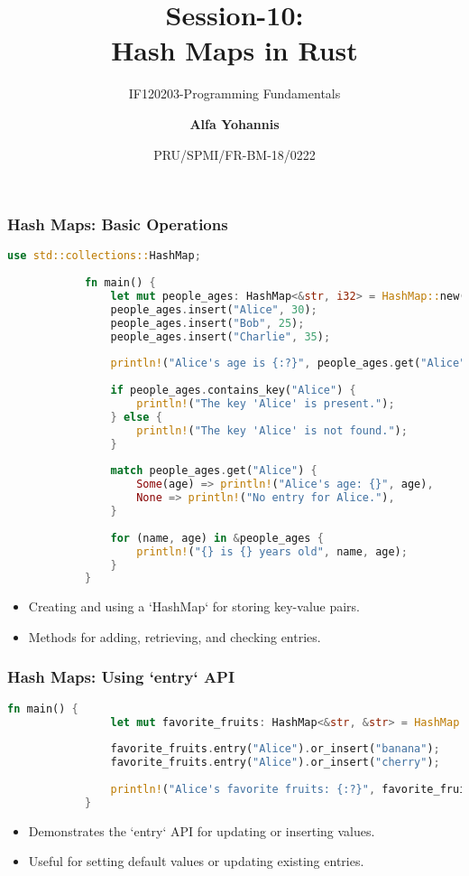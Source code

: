\documentclass[aspectratio=169, table]{beamer}
\subtitle{IF120203-Programming Fundamentals}
\title{Session-10:\\\LARGE{Hash Maps in Rust}\\ \vspace{10pt}}
\date[Serial]{\scriptsize {PRU/SPMI/FR-BM-18/0222}}
\author[Pradita]{\small{\textbf{Alfa Yohannis}}}
\begin{document}
	
	\frame{\titlepage}
	
	\begin{frame}[fragile]
		\frametitle{Hash Maps: Basic Operations}
		\begin{lstlisting}[language=Rust]
			use std::collections::HashMap;
			
			fn main() {
				let mut people_ages: HashMap<&str, i32> = HashMap::new();
				people_ages.insert("Alice", 30);
				people_ages.insert("Bob", 25);
				people_ages.insert("Charlie", 35);
				
				println!("Alice's age is {:?}", people_ages.get("Alice").unwrap());
				
				if people_ages.contains_key("Alice") {
					println!("The key 'Alice' is present.");
				} else {
					println!("The key 'Alice' is not found.");
				}
				
				match people_ages.get("Alice") {
					Some(age) => println!("Alice's age: {}", age),
					None => println!("No entry for Alice."),
				}
				
				for (name, age) in &people_ages {
					println!("{} is {} years old", name, age);
				}
			}
		\end{lstlisting}
		\begin{itemize}
			\item Creating and using a `HashMap` for storing key-value pairs.
			\item Methods for adding, retrieving, and checking entries.
		\end{itemize}
	\end{frame}
	
	\begin{frame}[fragile]
		\frametitle{Hash Maps: Using `entry` API}
		\begin{lstlisting}[language=Rust]
			fn main() {
				let mut favorite_fruits: HashMap<&str, &str> = HashMap::new();
				
				favorite_fruits.entry("Alice").or_insert("banana");
				favorite_fruits.entry("Alice").or_insert("cherry");
				
				println!("Alice's favorite fruits: {:?}", favorite_fruits);
			}
		\end{lstlisting}
		\begin{itemize}
			\item Demonstrates the `entry` API for updating or inserting values.
			\item Useful for setting default values or updating existing entries.
		\end{itemize}
	\end{frame}
	
\end{document}
